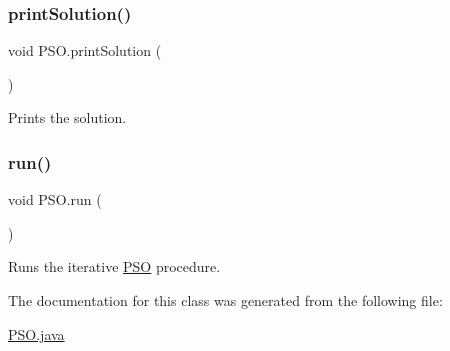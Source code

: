 \subsubsection{\texorpdfstring{print\+Solution()}{printSolution()}}
{\footnotesize\ttfamily void P\+S\+O.\+print\+Solution (\begin{DoxyParamCaption}{ }\end{DoxyParamCaption})}

Prints the solution. \mbox{\label{class_p_s_o_a689d26e00d138c809a4de0a34e98cd0a}} 
\subsubsection{\texorpdfstring{run()}{run()}}
{\footnotesize\ttfamily void P\+S\+O.\+run (\begin{DoxyParamCaption}{ }\end{DoxyParamCaption})}

Runs the iterative \hyperlink{class_p_s_o}{P\+SO} procedure. 

The documentation for this class was generated from the following file\+:\begin{DoxyCompactItemize}
\item 
\hyperlink{_p_s_o_8java}{P\+S\+O.\+java}\end{DoxyCompactItemize}
